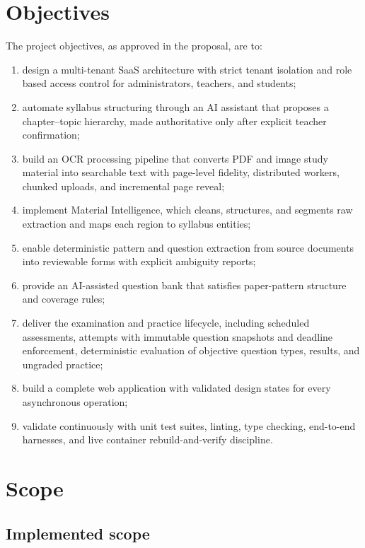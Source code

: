 \section{Objectives}

The project objectives, as approved in the proposal, are to:

\begin{enumerate}
  \item design a multi-tenant SaaS architecture with strict tenant isolation
        and role based access control for administrators, teachers, and
        students;
  \item automate syllabus structuring through an AI assistant that proposes a
        chapter--topic hierarchy, made authoritative only after explicit
        teacher confirmation;
  \item build an OCR processing pipeline that converts PDF and image study
        material into searchable text with page-level fidelity, distributed
        workers, chunked uploads, and incremental page reveal;
  \item implement Material Intelligence, which cleans, structures, and
        segments raw extraction and maps each region to syllabus entities;
  \item enable deterministic pattern and question extraction from source
        documents into reviewable forms with explicit ambiguity reports;
  \item provide an AI-assisted question bank that satisfies paper-pattern
        structure and coverage rules;
  \item deliver the examination and practice lifecycle, including scheduled
        assessments, attempts with immutable question snapshots and deadline
        enforcement, deterministic evaluation of objective question types,
        results, and ungraded practice;
  \item build a complete web application with validated design states for
        every asynchronous operation;
  \item validate continuously with unit test suites, linting, type checking,
        end-to-end harnesses, and live container rebuild-and-verify
        discipline.
\end{enumerate}

\section{Scope}

\subsection{Implemented scope}


